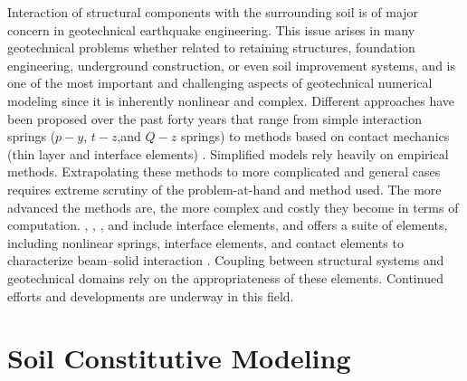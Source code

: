 Interaction of structural components with the surrounding soil is of major concern in geotechnical earthquake engineering. This issue arises in many geotechnical problems whether related to retaining structures, foundation engineering, underground construction, or even soil improvement systems, and is one of the most important and challenging aspects of geotechnical numerical modeling since it is inherently nonlinear and complex. Different approaches have been proposed over the past forty years that range from simple interaction springs ($p-y$, $t-z$,and $Q-z$ springs) \citep{API07} to methods based on contact mechanics (thin layer and interface elements) \citep[see][]{Laursen02}. Simplified models rely heavily on empirical methods. Extrapolating these methods to more complicated and general cases requires extreme scrutiny of the problem-at-hand and method used. The more advanced the methods are, the more complex and costly they become in terms of computation. , , , and  include interface elements, and  offers a suite of elements, including nonlinear springs, interface elements, and contact elements to characterize beam--solid interaction \citep[see][]{Petek06, Ghofrani18}. Coupling between structural systems and geotechnical domains rely on the appropriateness of these elements. Continued efforts and developments are underway in this field. 

\section{Soil Constitutive Modeling}
\label{sec:resp_geotech_4}

